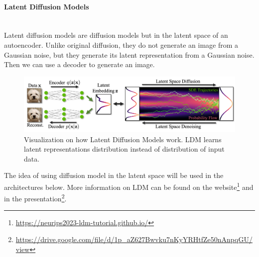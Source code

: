 \paragraph{Latent Diffusion Models}\mbox{}\\
\indent Latent diffusion models are diffusion models but in the latent space of an autoencoder. Unlike original diffusion, they do not generate an image from a Gaussian noise, but they generate its latent representation from a Gaussian noise. Then we can use a decoder to generate an image.

\begin{figure}[H]
    \centering
    \includegraphics[width=\linewidth]{concept_engineering/ldm/ldm_figure.png}
    \caption{Visualization on how Latent Diffusion Models work. LDM learns latent representations distribution instead of distribution of input data\cite{neurips2023-ldm-tutorial/neurips2023-ldm-tutorial.github.io_2023}.}
    \label{fig:ldm}
\end{figure}

The idea of using diffusion model in the latent space will be used in the architectures below.
More information on LDM can be found on the website\footnote{\url{https://neurips2023-ldm-tutorial.github.io/}} and in the presentation\footnote{\url{https://drive.google.com/file/d/1p_aZ627Bwvku7nKyYRHtfZe50nAnpqGU/view}}.

